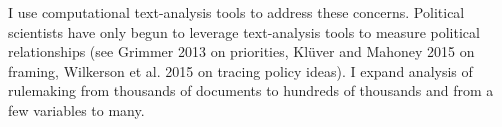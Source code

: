 I use computational text-analysis tools to address these concerns. Political scientists have only begun to leverage text-analysis tools to measure political relationships (see Grimmer 2013 on priorities, Kl\"uver and Mahoney 2015 on framing, Wilkerson et al. 2015 on tracing policy ideas). I expand analysis of rulemaking from thousands of documents to hundreds of thousands and from a few variables to many. %



